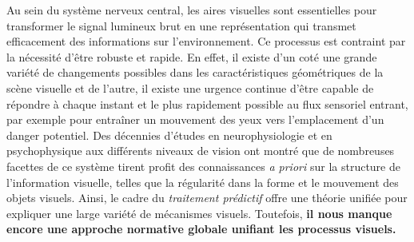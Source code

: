 %

Au sein du système nerveux central, les aires visuelles sont
essentielles pour transformer le signal lumineux brut en une
représentation qui transmet efficacement des informations sur
l'environnement. Ce processus est contraint par la nécessité d'être robuste
et rapide. En effet, il existe d'un coté une grande variété de
changements possibles dans les caractéristiques géométriques de la
scène visuelle et de l'autre, il existe une urgence continue d'être capable de répondre à chaque instant et le plus rapidement
possible au flux sensoriel entrant, par exemple pour entraîner un
mouvement des yeux vers l'emplacement d'un danger potentiel. Des
décennies d'études en neurophysiologie et en psychophysique aux
différents niveaux de vision ont montré que de nombreuses facettes de ce système tirent profit des
connaissances \emph{a priori} sur la structure de l'information visuelle,
telles que la régularité dans la forme et le mouvement des objets
visuels. Ainsi, le cadre du \emph{traitement prédictif} offre une théorie
unifiée pour expliquer une large variété de mécanismes visuels. Toutefois, \textbf{il
nous manque encore une approche normative globale unifiant les
processus visuels.}

